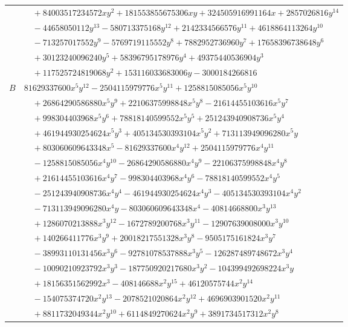 \documentclass[11pt]{article}
\begin{document}
\begin{longtable}{@{}ll@{}}
 & $\quad +84003517234572xy^{2}+181553855675306xy+324505916991164x+2857026816y^{14}$\\
 & $\quad -44658050112y^{13}-580713375168y^{12}+2142334566576y^{11}+4618864113264y^{10}$\\
 & $\quad -713257017552y^{9}-5769719115552y^{8}+7882952736960y^{7}+17658396738648y^{6}$\\
 & $\quad +30123240096240y^{5}+58396795178976y^{4}+49375440536904y^{3}$\\
 & $\quad +117525724819068y^{2}+153116033683006y-3000184266816$\\
$B$ & $81629337600x^{5}y^{12}-2504115979776x^{5}y^{11}+1258815085056x^{5}y^{10}$\\
 & $\quad +26864290586880x^{5}y^{9}+22106375998848x^{5}y^{8}-21614455103616x^{5}y^{7}$\\
 & $\quad +998304403968x^{5}y^{6}+78818140599552x^{5}y^{5}+251243940908736x^{5}y^{4}$\\
 & $\quad +461944930254624x^{5}y^{3}+405134530393104x^{5}y^{2}+713113949096280x^{5}y$\\
 & $\quad +803060609643348x^{5}-81629337600x^{4}y^{12}+2504115979776x^{4}y^{11}$\\
 & $\quad -1258815085056x^{4}y^{10}-26864290586880x^{4}y^{9}-22106375998848x^{4}y^{8}$\\
 & $\quad +21614455103616x^{4}y^{7}-998304403968x^{4}y^{6}-78818140599552x^{4}y^{5}$\\
 & $\quad -251243940908736x^{4}y^{4}-461944930254624x^{4}y^{3}-405134530393104x^{4}y^{2}$\\
 & $\quad -713113949096280x^{4}y-803060609643348x^{4}-40814668800x^{3}y^{13}$\\
 & $\quad +1286070213888x^{3}y^{12}-1672789200768x^{3}y^{11}-12907639008000x^{3}y^{10}$\\
 & $\quad +140266411776x^{3}y^{9}+20018217551328x^{3}y^{8}-9505175161824x^{3}y^{7}$\\
 & $\quad -38993110131456x^{3}y^{6}-92781078537888x^{3}y^{5}-126287489748672x^{3}y^{4}$\\
 & $\quad -10090210923792x^{3}y^{3}-187750920217680x^{3}y^{2}-104399492698224x^{3}y$\\
 & $\quad +18156351562992x^{3}-408146688x^{2}y^{15}+46120575744x^{2}y^{14}$\\
 & $\quad -154075374720x^{2}y^{13}-2078521020864x^{2}y^{12}+4696903901520x^{2}y^{11}$\\
 & $\quad +8811732049344x^{2}y^{10}+6114849270624x^{2}y^{9}+3891734517312x^{2}y^{8}$\\

\end{longtable}
\end{document}
